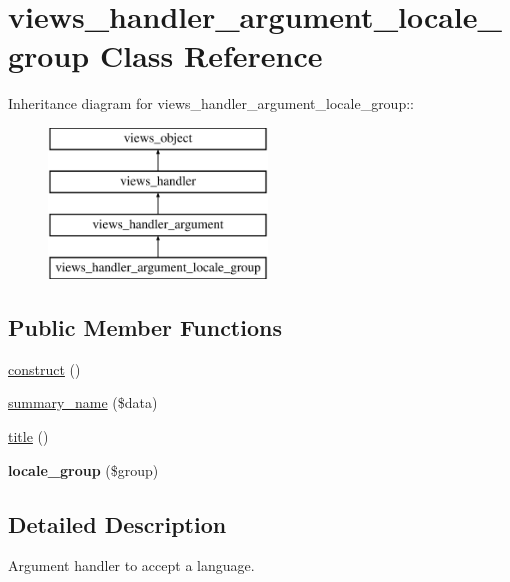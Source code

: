 \hypertarget{classviews__handler__argument__locale__group}{
\section{views\_\-handler\_\-argument\_\-locale\_\-group Class Reference}
\label{classviews__handler__argument__locale__group}
}
Inheritance diagram for views\_\-handler\_\-argument\_\-locale\_\-group::\begin{figure}[H]
\begin{center}
\leavevmode
\includegraphics[height=4cm]{classviews__handler__argument__locale__group}
\end{center}
\end{figure}
\subsection*{Public Member Functions}
\begin{CompactItemize}
\item 
\hyperlink{classviews__handler__argument__locale__group_5dd96da33f67166727c6af6547ccbb7a}{construct} ()
\item 
\hyperlink{classviews__handler__argument__locale__group_effcc011f90a9269f7793e089b994f71}{summary\_\-name} (\$data)
\item 
\hyperlink{classviews__handler__argument__locale__group_5eb8e22e84904fa604f785484befe86a}{title} ()
\item 
\hypertarget{classviews__handler__argument__locale__group_11e6dc97e511dffc715eff8ec1fb784a}{
\textbf{locale\_\-group} (\$group)}
\label{classviews__handler__argument__locale__group_11e6dc97e511dffc715eff8ec1fb784a}

\end{CompactItemize}


\subsection{Detailed Description}
Argument handler to accept a language. 

